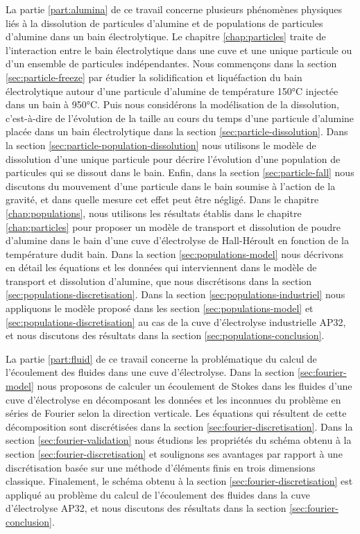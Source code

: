 La partie \ref{part:alumina} de ce travail concerne plusieurs
phénomènes physiques liés à la dissolution de particules d'alumine et
de populations de particules d'alumine dans un bain électrolytique. Le
chapitre \ref{chap:particles} traite de l'interaction entre le bain
électrolytique dans une cuve et une unique particule ou d'un ensemble
de particules indépendantes. Nous commençons dans la section
\ref{sec:particle-freeze} par étudier la solidification et
liquéfaction du bain électrolytique autour d'une particule d'alumine
de température \num{150}\si{\celsius} injectée dans un bain à
\num{950}\si{\celsius}. Puis nous considérons la modélisation de la
dissolution, c'est-à-dire de l'évolution de la taille au cours du
temps d'une particule d'alumine placée dans un bain électrolytique
dans la section \ref{sec:particle-dissolution}. Dans la section
\ref{sec:particle-population-dissolution} nous utilisons le modèle de
dissolution d'une unique particule pour décrire l'évolution d'une
population de particules qui se dissout dans le bain. Enfin, dans la
section \ref{sec:particle-fall} nous discutons du mouvement d'une
particule dans le bain soumise à l'action de la gravité, et dans
quelle mesure cet effet peut être négligé. Dans le chapitre
\ref{chap:populations}, nous utilisons les résultats établis dans le
chapitre \ref{chap:particles} pour proposer un modèle de transport et
dissolution de poudre d'alumine dans le bain d'une cuve d'électrolyse
de Hall-Héroult en fonction de la température dudit bain. Dans la
section \ref{sec:populations-model} nous décrivons en détail les
équations et les données qui interviennent dans le modèle de transport
et dissolution d'alumine, que nous discrétisons dans la section
\ref{sec:populations-discretisation}. Dans la section
\ref{sec:populations-industriel} nous appliquons le modèle proposé
dans les section \ref{sec:populations-model} et
\ref{sec:populations-discretisation} au cas de la cuve d'électrolyse
industrielle AP32, et nous discutons des résultats dans la section
\ref{sec:populations-conclusion}.

La partie \ref{part:fluid} de ce travail concerne la problématique du
calcul de l'écoulement des fluides dans une cuve d'électrolyse. Dans
la section \ref{sec:fourier-model} nous proposons de calculer un
écoulement de Stokes dans les fluides d'une cuve d'électrolyse en
décomposant les données et les inconnues du problème en séries de
Fourier selon la direction verticale. Les équations qui résultent de
cette décomposition sont discrétisées dans la section
\ref{sec:fourier-discretisation}. Dans la section
\ref{sec:fourier-validation} nous étudions les propriétés du schéma
obtenu à la section \ref{sec:fourier-discretisation} et soulignons ses
avantages par rapport à une discrétisation basée sur une méthode
d'éléments finis en trois dimensions classique. Finalement, le schéma
obtenu à la section \ref{sec:fourier-discretisation} est appliqué au
problème du calcul de l'écoulement des fluides dans la cuve
d'électrolyse AP32, et nous discutons des résultats dans la section
\ref{sec:fourier-conclusion}.
